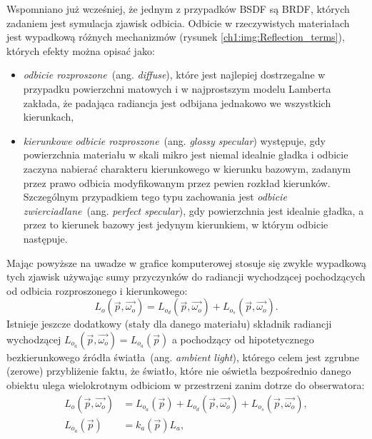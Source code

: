 Wspomniano już wcześniej, że jednym z przypadków BSDF są BRDF, których zadaniem jest symulacja zjawisk odbicia. Odbicie w rzeczywistych materiałach jest wypadkową różnych mechanizmów (rysunek \ref{ch1:img:Reflection_terms}), których efekty można opisać jako:
\begin{itemize}
\item \textit{odbicie rozproszone}~(ang. \textit{diffuse}), które jest najlepiej dostrzegalne w przypadku powierzchni matowych i w najprostszym modelu Lamberta zakłada, że padająca radiancja jest odbijana jednakowo we wszystkich kierunkach,
\item \textit{kierunkowe odbicie rozproszone}~(ang. \textit{glossy specular}) występuje, gdy powierzchnia materiału w skali mikro jest niemal idealnie gładka i odbicie zaczyna nabierać charakteru kierunkowego w kierunku bazowym, zadanym przez prawo odbicia modyfikowanym przez pewien rozkład kierunków. Szczególnym przypadkiem tego typu zachowania jest \textit{odbicie zwierciadlane}~(ang. \textit{perfect specular}), gdy powierzchnia jest idealnie gładka, a przez to kierunek bazowy jest jedynym kierunkiem, w którym odbicie następuje. 
\end{itemize}
Mając powyższe na uwadze w grafice komputerowej stosuje się zwykle wypadkową tych zjawisk używając sumy przyczynków do radiancji wychodzącej pochodzących od odbicia rozproszonego i kierunkowego:
\begin{equation}
L_o(\vec{p}, \vec{\omega_o}) = L_{o_d}(\vec{p}, \vec{\omega_o}) + L_{o_s}(\vec{p}, \vec{\omega_o}).
\end{equation}
Istnieje jeszcze dodatkowy (stały dla danego materiału) składnik radiancji wychodzącej $L_{o_a}(\vec{p}, \vec{\omega_o})=L_{o_a}(\vec{p})$ a pochodzący od hipotetycznego bezkierunkowego źródła światła~(ang. \textit{ambient light}), którego celem jest zgrubne (zerowe) przybliżenie faktu, że światło, które nie oświetla bezpośrednio danego obiektu ulega wielokrotnym odbiciom w przestrzeni zanim dotrze do obserwatora:
\begin{align}
L_o(\vec{p}, \vec{\omega_o}) &= L_{o_a}(\vec{p}) + L_{o_d}(\vec{p}, \vec{\omega_o}) + L_{o_s}(\vec{p}, \vec{\omega_o}),\\
L_{o_a}(\vec{p}) &= k_a(\vec{p})L_a,
\end{align}
